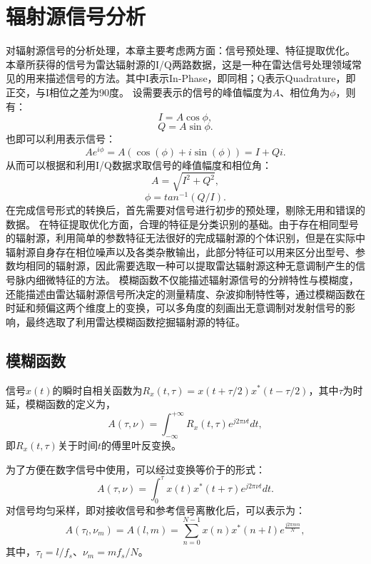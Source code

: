 \section{辐射源信号分析}
\label{sec:sei_data}
对辐射源信号的分析处理，本章主要考虑两方面：信号预处理、特征提取优化。
本章所获得的信号为雷达辐射源的I/Q两路数据，这是一种在雷达信号处理领域常见的用来描述信号的方法。其中I表示In-Phase，即同相；Q表示Quadrature，即正交，与I相位之差为90度。
设需要表示的信号的峰值幅度为$A$、相位角为$\phi$，则有：
\begin{equation}
	I = A\cos{\phi},
	\label{equ:i}
\end{equation}
\begin{equation}
	Q = A\sin{\phi}.
	\label{equ:q}
\end{equation}
也即可以利用表示信号：
\begin{equation}
	Ae^{i\phi}=A(\cos(\phi) + i\sin(\phi))=I+Qi.
	\label{equ:signal}
\end{equation}
从而可以根据和利用I/Q数据求取信号的峰值幅度和相位角：
\begin{equation}
	A=\sqrt{I^2+Q^2},
\end{equation}
\begin{equation}
	\phi=tan^{-1}(Q/I).
\end{equation}
在完成信号形式的转换后，首先需要对信号进行初步的预处理，剔除无用和错误的数据。
在特征提取优化方面，合理的特征是分类识别的基础。由于存在相同型号的辐射源，利用简单的参数特征无法很好的完成辐射源的个体识别，但是在实际中辐射源自身存在相位噪声以及各类杂散输出，此部分特征可以用来区分出型号、参数均相同的辐射源，因此需要选取一种可以提取雷达辐射源这种无意调制产生的信号脉内细微特征的方法。
模糊函数不仅能描述辐射源信号的分辨特性与模糊度，还能描述由雷达辐射源信号所决定的测量精度、杂波抑制特性等，通过模糊函数在时延和频偏这两个维度上的变换，可以多角度的刻画出无意调制对发射信号的影响，最终选取了利用雷达模糊函数挖掘辐射源的特征。
\subsection{模糊函数}
信号$x(t)$的瞬时自相关函数为$R_x(t,\tau)=x(t+\tau/2)x^{*}(t-\tau/2)$，其中$\tau$为时延，模糊函数的定义为，
\begin{equation}
A(\tau,\nu) = \int_{-\infty}^{+\infty}R_x(t,\tau)e^{j2\pi\nu t}dt,
\label{equ:defineaf}
\end{equation}
即$R_x(t,\tau)$关于时间$t$的傅里叶反变换。

为了方便在数字信号中使用，可以经过变换等价于的形式：
\begin{equation}
A(\tau,\nu) = \int_{0}^{\tau}x(t)x^{*}(t+\tau)e^{j2\pi\nu t}dt.
\label{equ:afcon}
\end{equation}
对信号均匀采样，即对接收信号和参考信号离散化后，可以表示为：
\begin{equation}
A(\tau_l,\nu_m) = A(l, m) = \sum_{n = 0}^{N-1}x(n)x^{*}(n+l)e^{\frac{j2\pi m n}{N}},
\end{equation}
其中，$\tau_l=l/f_s$、$\nu_m=mf_s/N$。

